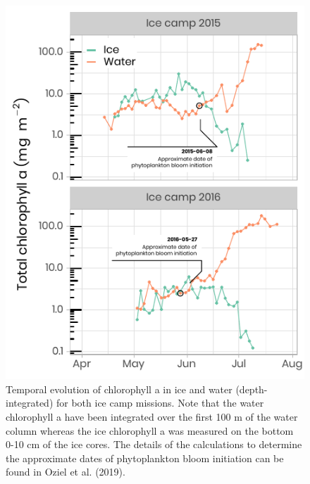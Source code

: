 \documentclass[12pt,a4paper]{scrartcl}
\begin{document}
\begin{figure}[h]
	\centering
	\includegraphics[scale = 1]{../../../graphs/fig10.pdf}
	\caption{Temporal evolution of chlorophyll a in ice and water (depth-integrated) for both ice camp missions. Note that the water chlorophyll a have been integrated over the first 100 m of the water column whereas the ice chlorophyll a was measured on the bottom 0-10 cm of the ice cores. The details of the calculations to determine the approximate dates of phytoplankton bloom initiation can be found in Oziel et al. (2019).}
\end{figure}

\clearpage
\newpage
\end{document}

